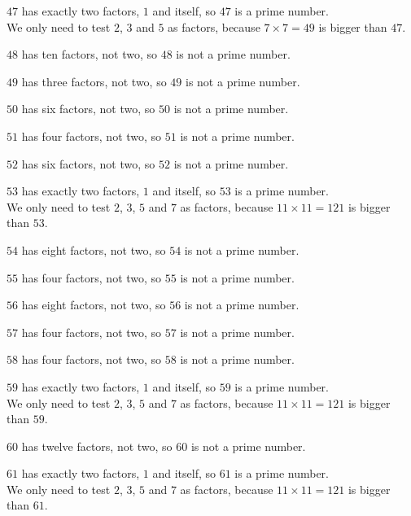 \documentclass[aspectratio=169]{beamer}
\begin{document}
  {$47$ has exactly two factors, $1$ and itself, so $47$ is a prime number.\\[0.45em]We only need to test $2$, $3$ and $5$ as factors, because $7\times 7=49$ is bigger than $47$.}

  {$48$ has ten factors, not two, so $48$ is not a prime number.}

  {$49$ has three factors, not two, so $49$ is not a prime number.}

  {$50$ has six factors, not two, so $50$ is not a prime number.}

  {$51$ has four factors, not two, so $51$ is not a prime number.}

  {$52$ has six factors, not two, so $52$ is not a prime number.}

  {$53$ has exactly two factors, $1$ and itself, so $53$ is a prime number.\\[0.45em]We only need to test $2$, $3$, $5$ and $7$ as factors, because $11\times 11=121$ is bigger than $53$.}

  {$54$ has eight factors, not two, so $54$ is not a prime number.}

  {$55$ has four factors, not two, so $55$ is not a prime number.}

  {$56$ has eight factors, not two, so $56$ is not a prime number.}

  {$57$ has four factors, not two, so $57$ is not a prime number.}

  {$58$ has four factors, not two, so $58$ is not a prime number.}

  {$59$ has exactly two factors, $1$ and itself, so $59$ is a prime number.\\[0.45em]We only need to test $2$, $3$, $5$ and $7$ as factors, because $11\times 11=121$ is bigger than $59$.}

  {$60$ has twelve factors, not two, so $60$ is not a prime number.}

  {$61$ has exactly two factors, $1$ and itself, so $61$ is a prime number.\\[0.45em]We only need to test $2$, $3$, $5$ and $7$ as factors, because $11\times 11=121$ is bigger than $61$.}
\end{document}

